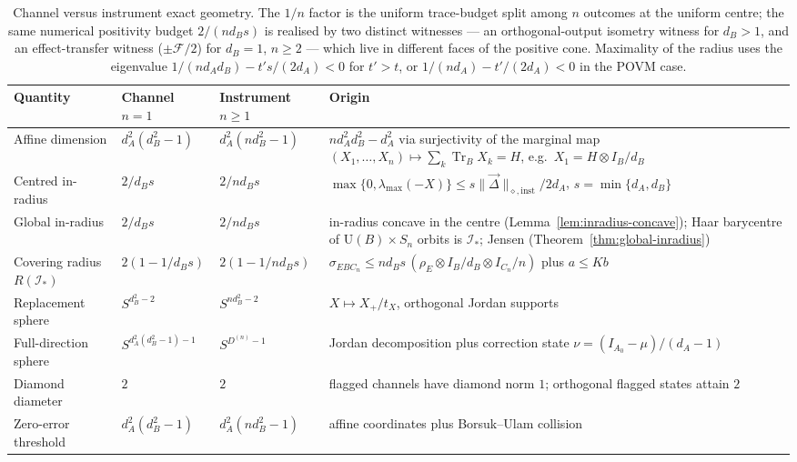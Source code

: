 \documentclass[11pt,a4paper]{article}
\newcommand{\Tr}{\operatorname{Tr}}
\newcommand{\vD}{\vec{\Delta}}
\begin{document}
\begin{table}[t]
\centering
\small
\setlength{\tabcolsep}{4pt}
\begin{tabular}{p{3.4cm}p{3.0cm}p{3.0cm}p{3.4cm}}
\toprule
Quantity & Channel $n=1$ & Instrument $n\ge1$ & Origin \\
\midrule
Affine dimension & $d_A^2(d_B^2-1)$ & $d_A^2(nd_B^2-1)$ & $nd_A^2d_B^2-d_A^2$ via surjectivity of the marginal map $(X_1,\dots,X_n)\mapsto\sum_k\Tr_BX_k=H$, e.g.\ $X_1=H\otimes I_B/d_B$\\
Centred in-radius & $2/d_Bs$ & $2/nd_Bs$ & $\max\{0,\lambda_{\max}(-X)\}\le s\|\vD\|_{\diamond,\mathrm{inst}}/2d_A$, $s=\min\{d_A,d_B\}$\\
Global in-radius & $2/d_Bs$ & $2/nd_Bs$ & in-radius concave in the centre (Lemma~\ref{lem:inradius-concave}); Haar barycentre of $\mathrm U(B)\times S_n$ orbits is $\mathcal I_*$; Jensen (Theorem~\ref{thm:global-inradius})\\
Covering radius $R(\mathcal I_*)$ & $2(1-1/d_Bs)$ & $2(1-1/nd_Bs)$ & $\sigma_{EBC_n}\le nd_Bs\,(\rho_E\otimes I_B/d_B\otimes I_{C_n}/n)$ plus $a\le Kb$\\
Replacement sphere & $S^{d_B^2-2}$ & $S^{nd_B^2-2}$ & $X\mapsto X_+/t_X$, orthogonal Jordan supports\\
Full-direction sphere & $S^{d_A^2(d_B^2-1)-1}$ & $S^{D^{(n)}-1}$ & Jordan decomposition plus correction state $\nu=(I_{A_0}-\mu)/(d_A-1)$\\
Diamond diameter & $2$ & $2$ & flagged channels have diamond norm $1$; orthogonal flagged states attain $2$\\
Zero-error threshold & $d_A^2(d_B^2-1)$ & $d_A^2(nd_B^2-1)$ & affine coordinates plus Borsuk--Ulam collision\\
\bottomrule
\end{tabular}
\caption{Channel versus instrument exact geometry. The $1/n$ factor is the uniform trace-budget split among $n$ outcomes at the uniform centre; the same numerical positivity budget $2/(nd_Bs)$ is realised by two distinct witnesses --- an orthogonal-output isometry witness for $d_B>1$, and an effect-transfer witness ($\pm\mathcal F/2$) for $d_B=1$, $n\ge2$ --- which live in different faces of the positive cone. Maximality of the radius uses the eigenvalue $1/(nd_Ad_B)-t's/(2d_A)<0$ for $t'>t$, or $1/(nd_A)-t'/(2d_A)<0$ in the POVM case.}
\label{tab:comparison}
\end{table}
\end{document}
